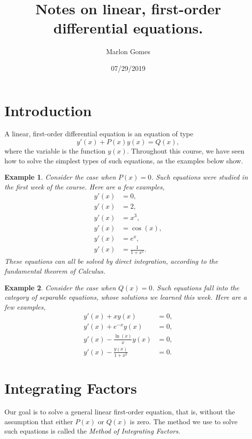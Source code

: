 \documentclass[11pt]{amsart}
\title[Notes on linear, first-order equations.]{Notes on linear, first-order differential equations.}
\author[M. Gomes]{Marlon Gomes}
\date{07/29/2019}
\newtheorem{example}{Example}[section]
\numberwithin{equation}{section}
\begin{document}
\maketitle

\section{Introduction}
A linear, first-order differential equation is an equation of type 
\begin{equation}
\label{model}
y'(x)+P(x)y(x)=Q(x),
\end{equation}
where the variable is the function $y(x)$. Throughout this course, we have seen how to solve the simplest types of such equations, as the examples below show. 

\begin{example}
Consider the case when $P(x)=0$. Such equations were studied in the first week of the course. Here are a few examples, 
\begin{align*}
y'(x) & = 0, \\
y'(x) & = 2, \\
y'(x) & = x^3, \\
y'(x) & = \cos(x), \\
y'(x) & =  e^x, \\
y'(x) & = \frac{1}{1+x^2}.
\end{align*}
These equations can all be solved by direct integration, according to the fundamental theorem of Calculus. 
\end{example}

\begin{example}
Consider the case when $Q(x)=0$. Such equations fall into the category of separable equations, whose solutions we learned this week. Here are a few examples, 
\begin{align*}
y'(x) + xy(x) & = 0, \\
y'(x)+ e^{-x} y(x) & = 0,\\
y'(x) - \frac{\ln(x)}{x}y(x) & = 0, \\
y'(x) - \frac{y(x)}{1+x^2} & = 0.
\end{align*}
\end{example}


\section{Integrating Factors}
Our goal is to solve a general linear first-order equation, that is, without the assumption that either $P(x)$ or $Q(x)$ is zero. The method we use to solve such equations is called the \textit{Method of Integrating Factors}. 
\end{document}
